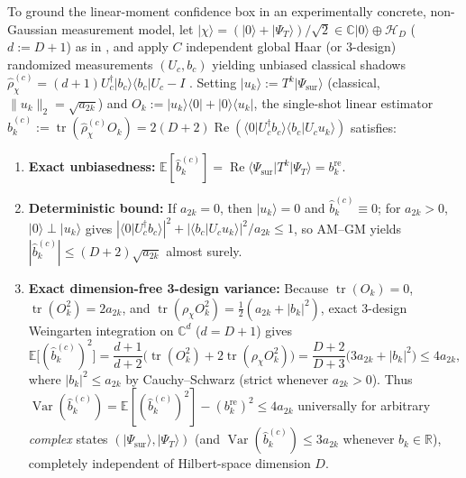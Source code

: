 \documentclass[11pt,a4paper]{article}
\theoremstyle{definition}
\DeclareMathOperator{\tr}{tr}
\DeclareMathOperator{\Var}{Var}
\newcommand{\C}{\mathbb{C}}
\newcommand{\R}{\mathbb{R}}
\newcommand{\ket}[1]{\lvert #1 \rangle}
\newcommand{\bra}[1]{\langle #1 \rvert}
\newcommand{\braket}[2]{\langle #1 \vert #2 \rangle}
\begin{document}
To ground the linear-moment confidence box in an experimentally concrete, non-Gaussian measurement model, let $\ket{\chi} = (\ket{0} + \ket{\Psi_T})/\sqrt{2} \in \C\ket{0} \oplus \mathcal{H}_D$ ($d := D + 1$) as in \cite[Eq.~(S2.12)]{jiang2026machine}, and apply $C$ independent global Haar (or 3-design) randomized measurements $(U_c, b_c)$ yielding unbiased classical shadows $\hat{\rho}_\chi^{(c)} = (d+1) U_c^\dagger \ket{b_c}\bra{b_c} U_c - I$ \cite{huang2020predicting}. Setting $\ket{u_k} := T^k \ket{\Psi_{\mathrm{sur}}}$ (classical, $\|u_k\|_2 = \sqrt{a_{2k}}$) and $O_k := \ket{u_k}\bra{0} + \ket{0}\bra{u_k}$, the single-shot linear estimator $\hat{b}_k^{(c)} := \tr(\hat{\rho}_\chi^{(c)} O_k) = 2(D+2)\operatorname{Re}(\braket{0}{U_c^\dagger b_c}\braket{b_c}{U_c u_k})$ satisfies:
\begin{enumerate}[leftmargin=1.5em]
  \item \textbf{Exact unbiasedness:} $\mathbb{E}[\hat{b}_k^{(c)}] = \operatorname{Re}\bra{\Psi_{\mathrm{sur}}} T^k \ket{\Psi_T} = b_k^{\mathrm{re}}$.
  \item \textbf{Deterministic bound:} If $a_{2k} = 0$, then $\ket{u_k} = 0$ and $\hat{b}_k^{(c)} \equiv 0$; for $a_{2k} > 0$, $\ket{0} \perp \ket{u_k}$ gives $|\braket{0}{U_c^\dagger b_c}|^2 + |\braket{b_c}{U_c u_k}|^2 / a_{2k} \le 1$, so AM--GM yields $|\hat{b}_k^{(c)}| \le (D+2)\sqrt{a_{2k}}$ almost surely.
  \item \textbf{Exact dimension-free 3-design variance:} Because $\tr(O_k) = 0$, $\tr(O_k^2) = 2 a_{2k}$, and $\tr(\rho_\chi O_k^2) = \frac{1}{2}(a_{2k} + |b_k|^2)$, exact 3-design Weingarten integration on $\C^d$ ($d = D+1$) gives
  \begin{equation}\label{eq:exact_3design_var}
    \mathbb{E}\big[(\hat{b}_k^{(c)})^2\big] = \frac{d+1}{d+2}\big(\tr(O_k^2) + 2\tr(\rho_\chi O_k^2)\big) = \frac{D+2}{D+3}\big(3 a_{2k} + |b_k|^2\big) \le 4 a_{2k},
  \end{equation}
  where $|b_k|^2 \le a_{2k}$ by Cauchy--Schwarz (strict whenever $a_{2k} > 0$). Thus $\Var(\hat{b}_k^{(c)}) = \mathbb{E}[(\hat{b}_k^{(c)})^2] - (b_k^{\mathrm{re}})^2 \le 4 a_{2k}$ universally for arbitrary \emph{complex} states $(\ket{\Psi_{\mathrm{sur}}}, \ket{\Psi_T})$ (and $\Var(\hat{b}_k^{(c)}) \le 3 a_{2k}$ whenever $b_k \in \R$), completely independent of Hilbert-space dimension $D$.
\end{enumerate}
\end{document}
